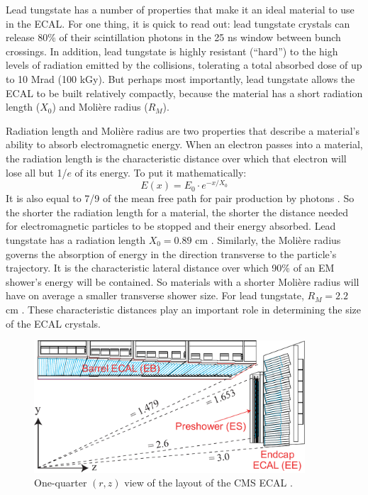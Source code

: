 Lead tungstate has a number of properties that make it an ideal
material to use in the ECAL. For one thing, it is quick to read
out: lead tungstate crystals can release 80\% of their scintillation
photons in the 25 ns window between bunch crossings. In
addition, lead tungstate is highly resistant (``hard'') to the high
levels of radiation emitted by the collisions, tolerating a total
absorbed dose of up to 10 Mrad (100 kGy). But perhaps most importantly,
lead tungstate allows the ECAL to be built relatively compactly,
because the material has a short radiation length ($X_0$) and
Moli\`{e}re radius ($R_M$).

Radiation length and Moli\`{e}re radius are two properties that
describe a material's ability to absorb electromagnetic energy. When
an electron passes into a material, the radiation length is the
characteristic distance over which that electron will lose all
but 1/$e$ of its energy. To put it mathematically:
\begin{equation}
\label{eq:cms:ecal:radlength}
E(x) = E_0 \cdot e^{-x/X_0}
\end{equation}
It is also equal to 7/9 of the mean free path for pair production by
photons \cite{pdg}. So the shorter the radiation length for a
material, the shorter the distance needed for electromagnetic
particles to be stopped and their energy absorbed. Lead tungstate has
a radiation length $X_0 = 0.89$ cm \cite{tdr}. Similarly, the
Moli\`{e}re radius governs the absorption of energy in the direction
transverse to the particle's trajectory. It is the characteristic
lateral distance over which 90\% of an EM shower's energy will be
contained. So materials with a shorter Moli\`{e}re radius will have on
average a smaller transverse shower size. For lead tungstate, $R_M =
2.2$ cm \cite{tdr}. These characteristic distances play an important
role in determining the size of the ECAL crystals.

\begin{figure}[htb]
\centering
\includegraphics[width=0.9\textwidth]{figures/ecal-layout.pdf}
\caption[One-quarter $(r,z)$ view of the layout of the CMS ECAL.]{One-quarter $(r,z)$
  view of the layout of the CMS ECAL \cite{tdr}.}
\label{fig:cms:ecal}
\end{figure}

